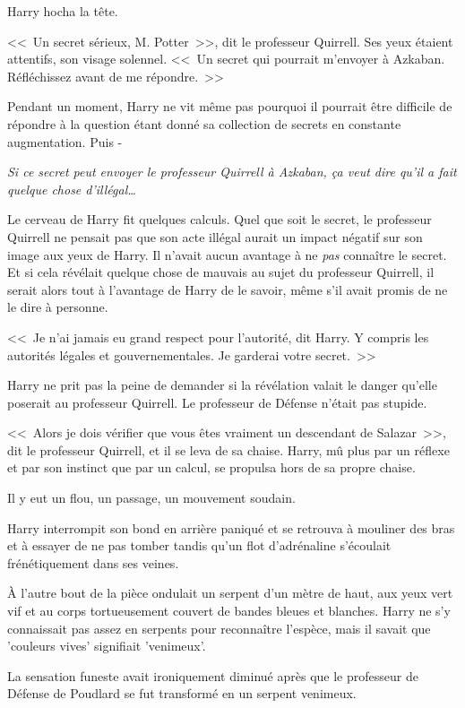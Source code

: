 Harry hocha la tête.

<<~Un secret sérieux, M. Potter~>>, dit le professeur Quirrell. Ses yeux étaient attentifs, son visage solennel. <<~Un secret qui pourrait m'envoyer à Azkaban. Réfléchissez avant de me répondre.~>>

Pendant un moment, Harry ne vit même pas pourquoi il pourrait être difficile de répondre à la question étant donné sa collection de secrets en constante augmentation. Puis -

\emph{Si ce secret peut envoyer le professeur Quirrell à Azkaban, ça veut dire qu'il a fait quelque chose d'illégal…}

Le cerveau de Harry fit quelques calculs. Quel que soit le secret, le professeur Quirrell ne pensait pas que son acte illégal aurait un impact négatif sur son image aux yeux de Harry. Il n'avait aucun avantage à ne \emph{pas} connaître le secret. Et si cela révélait quelque chose de mauvais au sujet du professeur Quirrell, il serait alors tout à l'avantage de Harry de le savoir, même s'il avait promis de ne le dire à personne.

<<~Je n'ai jamais eu grand respect pour l'autorité, dit Harry. Y compris les autorités légales et gouvernementales. Je garderai votre secret.~>>

Harry ne prit pas la peine de demander si la révélation valait le danger qu'elle poserait au professeur Quirrell. Le professeur de Défense n'était pas stupide.

<<~Alors je dois vérifier que vous êtes vraiment un descendant de Salazar~>>, dit le professeur Quirrell, et il se leva de sa chaise. Harry, mû plus par un réflexe et par son instinct que par un calcul, se propulsa hors de sa propre chaise.

Il y eut un flou, un passage, un mouvement soudain.

Harry interrompit son bond en arrière paniqué et se retrouva à mouliner des bras et à essayer de ne pas tomber tandis qu'un flot d'adrénaline s'écoulait frénétiquement dans ses veines.

À l'autre bout de la pièce ondulait un serpent d'un mètre de haut, aux yeux vert vif et au corps tortueusement couvert de bandes bleues et blanches. Harry ne s'y connaissait pas assez en serpents pour reconnaître l'espèce, mais il savait que 'couleurs vives' signifiait 'venimeux'.

La sensation funeste avait ironiquement diminué après que le professeur de Défense de Poudlard se fut transformé en un serpent venimeux.

